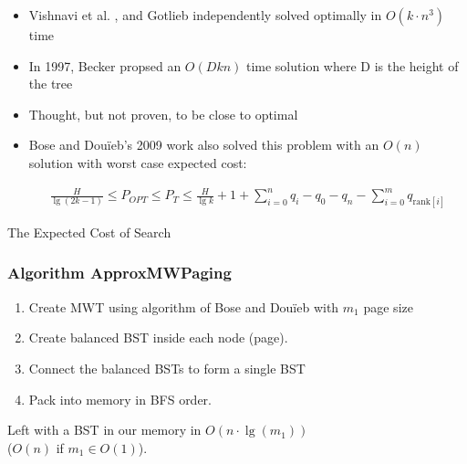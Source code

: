 \documentclass{beamer}
\theoremstyle{plain}
\begin{document}
\begin{frame}

\begin{itemize}

\item Vishnavi et al. \cite{vaishnavi1980optimum}, and Gotlieb  \cite{gotlieb1981optimal} independently solved optimally in $O(k\cdot n^3)$ time

\item In 1997, Becker propsed an $O(Dkn)$ time solution where D is the height of the tree \cite{becker1997construction}

\item Thought, but not proven, to be close to optimal

\item Bose and Dou\"{i}eb's 2009 work also solved this problem with an $O(n)$ solution with worst case expected cost:
\begin{scriptsize}
\begin{align*}
\frac{H}{\lg(2k-1)} \leq P_{OPT} \leq P_T \leq \frac{H}{\lg k} + 1 + \sum_{i=0}^n q_i - q_0 - q_n - \sum_{i=0}^m q_{\text{rank}[i]}
\end{align*}
\end{scriptsize}

\end{itemize}


\end{frame}

\begin{frame}{The Expected Cost of Search}



\end{frame}

\begin{frame}[fragile] \frametitle{Algorithm ApproxMWPaging}\label{Algorithm ApproxMWPaging}

\begin{enumerate}
\item Create MWT using algorithm of Bose and Dou\"{i}eb with $m_1$ page size

\item Create balanced BST inside each node (page).

\item Connect the balanced BSTs to form a single BST

\item Pack into memory in BFS order.

\end{enumerate}

\noindent Left with a BST in our memory in $O(n\cdot\lg(m_1))$  \\
($O(n)$ if $m_1 \in O(1)$).

\end{frame}
\end{document}
